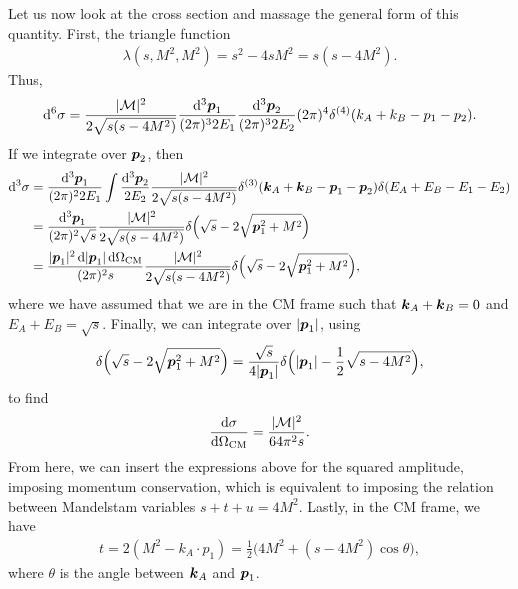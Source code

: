{Let us now look at the cross section and massage the general form of this quantity.
First, the triangle function
\begin{align}
    \lambda(s,M^2,M^2) = s^2 - 4 s M^2 = s ( s - 4 M^2 )
.\end{align}
Thus,
\begin{align}
    \dd[6]{\sigma} = \frac{|\mathcal{M}|^2}{2 \sqrt{s(s - 4 M^2)}} \frac{\dd[3]{\vb*{p}_1}}{(2 \pi)^3 2 E_1} \frac{\dd[3]{\vb*{p}_{2}}}{(2 \pi)^3 2 E_2} (2 \pi)^{4} \delta^{(4)}(k_{A} + k_{B} - p_1 - p_2)
.\end{align}
If we integrate over $\vb*{p}_{2}$, then
\begin{align}
    \dd[3]{\sigma} &= \frac{\dd[3]{\vb*{p}_{1}}}{(2 \pi)^2 2 E_1} \int \frac{\dd[3]{\vb*{p}_{2}}}{2 E_2} \frac{|\mathcal{M}|^2}{2 \sqrt{s (s - 4 M^2)}} \delta^{(3)}(\vb*{k}_{A} + \vb*{k}_{B} - \vb*{p}_{1} - \vb*{p}_{2}) \delta(E_{A} + E_{B} - E_{1} - E_{2}) \nonumber \\
                   &= \frac{\dd[3]{\vb*{p}_{1}}}{(2 \pi)^2 \sqrt{s}} \frac{|\mathcal{M}|^2}{2 \sqrt{s (s - 4 M^2)}} \delta\Big( \sqrt{s} - 2 \sqrt{\vb*{p}_{1}^2 + M^2} \Big) \nonumber \\
                   &= \frac{|\vb*{p}_{1}|^2 \dd{|\vb*{p}_{1}| \dd{\Omega_{\rm CM}}}}{(2 \pi)^2 s} \frac{|\mathcal{M}|^2}{2 \sqrt{s (s - 4 M^2)}} \delta\Big( \sqrt{s} - 2 \sqrt{\vb*{p}_{1}^2 + M^2} \Big)
,\end{align}
where we have assumed that we are in the CM frame such that $\vb*{k}_{A} + \vb*{k}_{B} = 0$ and $E_{A} + E_{B} = \sqrt{s}$.
Finally, we can integrate over $|\vb*{p}_{1}|$, using 
\begin{align}
    \delta\Big( \sqrt{s} - 2 \sqrt{\vb*{p}_{1}^2 + M^2} \Big) = \frac{\sqrt{s}}{4 |\vb*{p}_{1}|} \delta\Big( |\vb*{p}_{1}| - \frac{1}{2} \sqrt{s - 4 M^2} \Big)
,\end{align}
to find
\begin{align}
    \dv{\sigma}{\Omega_{\rm CM}} = \frac{|\mathcal{M}|^2}{64 \pi^2 s}
.\end{align}
From here, we can insert the expressions above for the squared amplitude, imposing momentum conservation, which is equivalent to imposing the relation between Mandelstam variables $s + t + u = 4 M^2$.
Lastly, in the CM frame, we have
\begin{align}
    t = 2 (M^2 - k_{A} \cdot p_1) = \frac{1}{2} \Big( 4 M^2 + (s - 4 M^2) \cos{\theta} \Big)
,\end{align}
where $\theta$ is the angle between $\vb*{k}_{A}$ and $\vb*{p}_{1}$.



}
    

